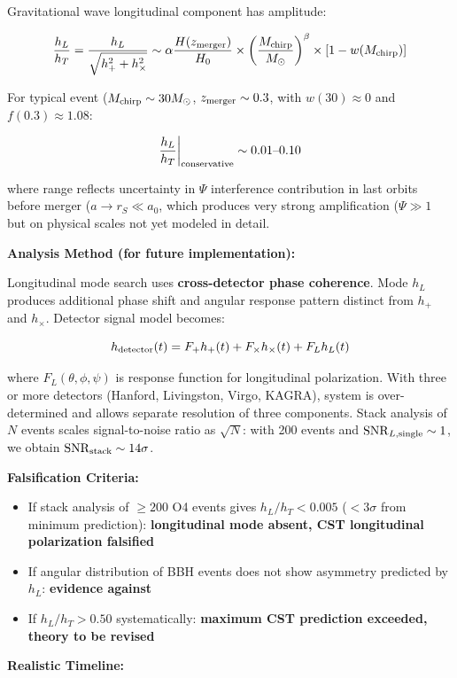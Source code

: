 \documentclass[10pt,a4paper]{article}
\providecommand{\tightlist}{\setlength{\itemsep}{0pt}\setlength{\parskip}{0pt}}
\begin{document}
Gravitational wave longitudinal component has amplitude:

\[\frac{h_L}{h_T} = \frac{h_L}{\sqrt{h_+^2 + h_\times^2}} \sim \alpha \frac{H(z_{\rm merger})}{H_0} \times \left(\frac{M_{\rm chirp}}{M_\odot}\right)^\beta \times [1-w(M_{\rm chirp})]\]

For typical event (\(M_{\rm chirp} \sim 30 M_\odot\),
\(z_{\rm merger} \sim 0.3\), with \(w(30) \approx 0\) and
\(f(0.3) \approx 1.08\):

\[\frac{h_L}{h_T}\bigg|_{\rm conservative} \sim 0.01\text{--}0.10\]

where range reflects uncertainty in \(\Psi\) interference contribution
in last orbits before merger (\(a \to r_S \ll a_0\), which produces
very strong amplification (\(\Psi \gg 1\) but on physical scales not
yet modeled in detail.

\textbf{Analysis Method (for future implementation):}

Longitudinal mode search uses \textbf{cross-detector phase coherence}.
Mode \(h_L\) produces additional phase shift and angular response
pattern distinct from \(h_+\) and \(h_\times\). Detector signal model
becomes:

\[h_{\rm detector}(t) = F_+ h_+(t) + F_\times h_\times(t) + F_L h_L(t)\]

where \(F_L(\theta,\phi,\psi)\) is response function for longitudinal
polarization. With three or more detectors (Hanford, Livingston, Virgo,
KAGRA), system is over-determined and allows separate resolution of
three components. Stack analysis of \(N\) events scales signal-to-noise
ratio as \(\sqrt{N}\): with 200 events and
\({\rm SNR}_{L,\rm single} \sim 1\), we obtain
\({\rm SNR}_{\rm stack} \sim 14\sigma\).

\textbf{Falsification Criteria:}

\begin{itemize}
\tightlist
\item
  If stack analysis of \(\geq 200\) O4 events gives \(h_L/h_T < 0.005\)
  (\(< 3\sigma\) from minimum prediction): \textbf{longitudinal mode
  absent, CST longitudinal polarization falsified}
\item
  If angular distribution of BBH events does not show asymmetry
  predicted by \(h_L\): \textbf{evidence against}
\item
  If \(h_L/h_T > 0.50\) systematically: \textbf{maximum CST prediction
  exceeded, theory to be revised}
\end{itemize}

\textbf{Realistic Timeline:}
\end{document}
